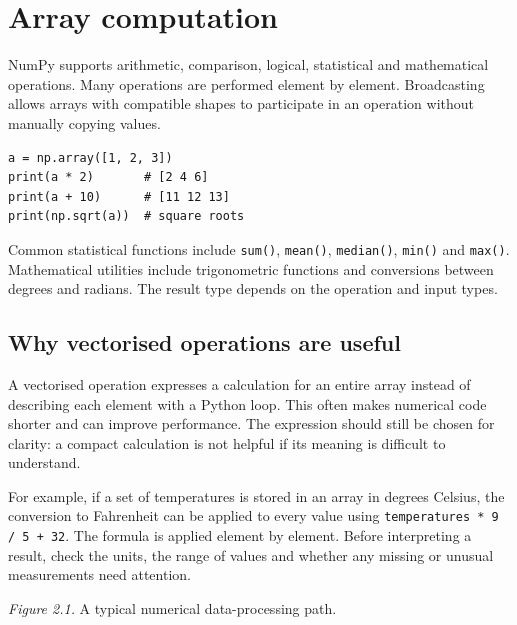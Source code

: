 \documentclass[11pt,openany,oneside]{book}
\begin{document}
\section{Array computation}
NumPy supports arithmetic, comparison, logical, statistical and mathematical operations. Many operations are performed element by element. Broadcasting allows arrays with compatible shapes to participate in an operation without manually copying values.

\begin{lstlisting}[style=pythonstyle]
a = np.array([1, 2, 3])
print(a * 2)       # [2 4 6]
print(a + 10)      # [11 12 13]
print(np.sqrt(a))  # square roots
\end{lstlisting}
Common statistical functions include \texttt{sum()}, \texttt{mean()}, \texttt{median()}, \texttt{min()} and \texttt{max()}. Mathematical utilities include trigonometric functions and conversions between degrees and radians. The result type depends on the operation and input types.

\subsection{Why vectorised operations are useful}
A vectorised operation expresses a calculation for an entire array instead of describing each element with a Python loop. This often makes numerical code shorter and can improve performance. The expression should still be chosen for clarity: a compact calculation is not helpful if its meaning is difficult to understand.

For example, if a set of temperatures is stored in an array in degrees Celsius, the conversion to Fahrenheit can be applied to every value using \texttt{temperatures * 9 / 5 + 32}. The formula is applied element by element. Before interpreting a result, check the units, the range of values and whether any missing or unusual measurements need attention.

\begin{center}
\end{center}
\textit{Figure 2.1.} A typical numerical data-processing path.
\end{document}
